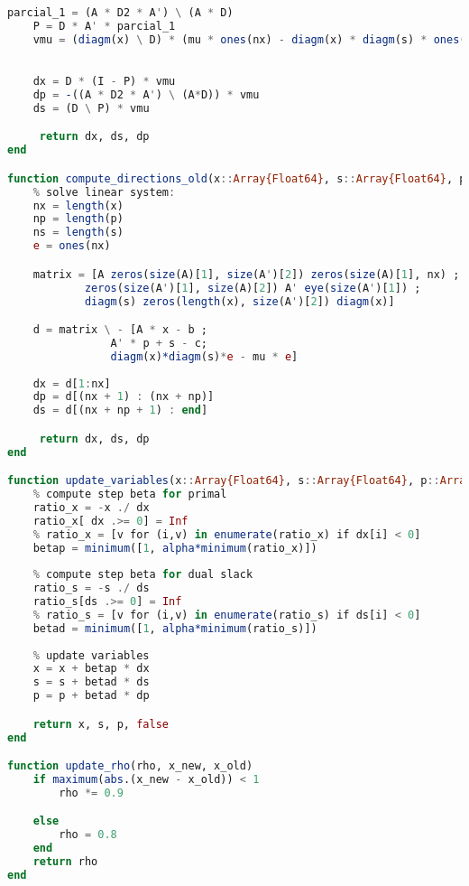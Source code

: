 \documentclass[a4paper]{IEEEtran}
\begin{document}
\begin{lstlisting}[language=Julia,numbers=none]
    parcial_1 = (A * D2 * A') \ (A * D)
    P = D * A' * parcial_1
    vmu = (diagm(x) \ D) * (mu * ones(nx) - diagm(x) * diagm(s) * ones(nx))
    

    dx = D * (I - P) * vmu
    dp = -((A * D2 * A') \ (A*D)) * vmu
    ds = (D \ P) * vmu

     return dx, ds, dp
end

function compute_directions_old(x::Array{Float64}, s::Array{Float64}, p::Array{Float64}, mu::Float64,  A::Array{Float64}, b::Array{Float64}, c::Array{Float64})
    % solve linear system:
    nx = length(x)
    np = length(p)
    ns = length(s)
    e = ones(nx)

    matrix = [A zeros(size(A)[1], size(A')[2]) zeros(size(A)[1], nx) ;
            zeros(size(A')[1], size(A)[2]) A' eye(size(A')[1]) ;
            diagm(s) zeros(length(x), size(A')[2]) diagm(x)]

    d = matrix \ - [A * x - b ;
                A' * p + s - c;
                diagm(x)*diagm(s)*e - mu * e]
    
    dx = d[1:nx]
    dp = d[(nx + 1) : (nx + np)]
    ds = d[(nx + np + 1) : end]

     return dx, ds, dp
end

function update_variables(x::Array{Float64}, s::Array{Float64}, p::Array{Float64}, dx::Array{Float64}, ds::Array{Float64}, dp::Array{Float64}, alpha::Float64)
    % compute step beta for primal
    ratio_x = -x ./ dx
    ratio_x[ dx .>= 0] = Inf
    % ratio_x = [v for (i,v) in enumerate(ratio_x) if dx[i] < 0]
    betap = minimum([1, alpha*minimum(ratio_x)]) 
    
    % compute step beta for dual slack
    ratio_s = -s ./ ds
    ratio_s[ds .>= 0] = Inf
    % ratio_s = [v for (i,v) in enumerate(ratio_s) if ds[i] < 0]
    betad = minimum([1, alpha*minimum(ratio_s)]) 
    
    % update variables
    x = x + betap * dx
    s = s + betad * ds
    p = p + betad * dp

    return x, s, p, false
end

function update_rho(rho, x_new, x_old)
    if maximum(abs.(x_new - x_old)) < 1
        rho *= 0.9

    else
        rho = 0.8
    end
    return rho
end 


\end{lstlisting}
\end{document}
